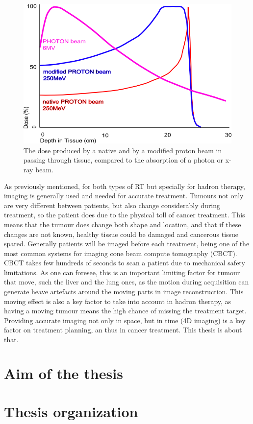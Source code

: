 \begin{figure}[ht]
\begin{center}
\includegraphics[width=0.6\columnwidth]{Introduction/BraggPeak.png}
\caption[Bragg peak]{The dose produced by a native and by a modified proton beam in passing through tissue, compared to the absorption of a photon or x-ray beam.\cite{bragg}}
\label{fig:bragg}
\end{center}
\end{figure}


As previously mentioned, for both types of RT but specially for hadron therapy, imaging is generally used and needed for accurate treatment. Tumours not only are very different between patients, but also change considerably during treatment, so the patient does due to the physical toll of cancer treatment. This means that the tumour does change both shape and location, and that if these changes are not known, healthy tissue could be damaged and cancerous tissue spared. Generally patients will be imaged before each treatment, being one of the most common systems for imaging cone beam compute tomography (CBCT). CBCT takes few hundreds of seconds to scan a patient due to mechanical safety limitations. As one can foresee, this is an important limiting factor for tumour that move, such the liver and the lung ones, as the motion during acquisition can generate heave artefacts around the moving parts in image reconstruction. This moving effect is also a key factor to take into account in hadron therapy, as having a moving tumour means the high chance of missing the treatment target. Providing accurate imaging not only in space, but in time (4D imaging) is a key factor on treatment planning, an thus in cancer treatment. This thesis is about that.






\section{Aim of the thesis}
\section{Thesis organization}


